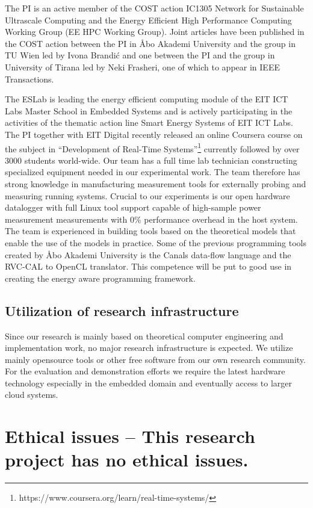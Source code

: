 \documentclass{article}
\begin{document}
The PI is an active member of the COST action IC1305 Network for Sustainable Ultrascale Computing and the Energy Efficient High Performance Computing Working Group (EE HPC Working Group). 
Joint articles have been published in the COST action between the PI in \AA{}bo Akademi University and the group in TU Wien led by Ivona Brandi\'{c} and one between the PI and the group in University of Tirana led by Neki Frasheri, one of which to appear in IEEE Transactions.\smallskip

The ESLab is leading the energy efficient computing module of the EIT ICT Labs Master School in Embedded Systems and is actively participating in the activities of the thematic action line Smart Energy Systems of EIT ICT Labs.
The PI together with EIT Digital recently released an online Coursera course on the subject in ``Development of Real-Time Systems''\footnote{https://www.coursera.org/learn/real-time-systems/} currently followed by over 3000 students world-wide.
Our team has a full time lab technician constructing specialized equipment needed in our experimental work. 
The team therefore has strong knowledge in manufacturing measurement tools for externally probing and measuring running systems. 
Crucial to our experiments is our open hardware datalogger with full Linux tool support capable of high-sample power measurement measurements with 0\% performance overhead in the host system. 
The team is experienced in building tools based on the theoretical models that enable the use of the models in practice. 
Some of the previous programming tools created by \AA{}bo Akademi University is the Canals data-flow language and the RVC-CAL to OpenCL translator. 
This competence will be put to good use in creating the energy aware programming framework.

\subsection{Utilization of research infrastructure}
Since our research is mainly based on theoretical computer engineering and implementation work, no major research infrastructure is expected.
We utilize mainly opensource tools or other free software from our own research community.
For the evaluation and demonstration efforts we require the latest hardware technology especially in the embedded domain and eventually access to larger cloud systems.

\section{Ethical issues \small -- This research project has no ethical issues. }
\end{document}
